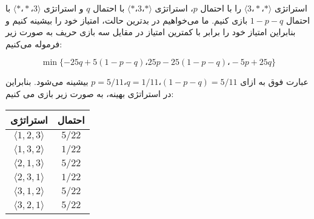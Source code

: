 \begin{solution}
استراتژی $\langle 3، *، *\rangle$ را با احتمال $p$، استراتژی $\langle *، 3، *\rangle$ با احتمال $q$ و استراتژی $\langle *، *، 3 \rangle$ با احتمال $1-p-q$ بازی کنیم.
ما می‌خواهیم در بدترین حالت، امتیاز خود را بیشینه کنیم و بنابراین امتیاز خود را برابر با کمترین امتیاز در مقایل سه بازی حریف به صورت زیر فرموله می‌کنیم:

$$\min\{-25q + 5 (1-p-q)، 25p - 25 (1-p-q)، -5p+25q \}$$

عبارت فوق به ازای  $p=5/11، q=1/11، (1-p-q) = 5/11$ بیشینه می‌شود. بنابراین در استراتژی بهینه، به صورت زیر بازی می کنیم:

\begin{center}
	\begin{tabular}{|c|c|}
		\hline
		استراتژی & احتمال\\
		\hline
		$\langle 1, 2, 3\rangle$& $5/22$\\
		\hline
		$\langle 1, 3, 2\rangle$& $1/22$\\
		\hline
		$\langle 2, 1, 3\rangle$& $5/22$\\
		\hline
		$\langle 2, 3, 1\rangle$& $1/22$\\
		\hline
		$\langle 3, 1, 2\rangle$& $5/22$\\
		\hline
		$\langle 3, 2, 1\rangle$& $5/22$\\
		\hline
	\end{tabular}
\end{center}

\end{solution}